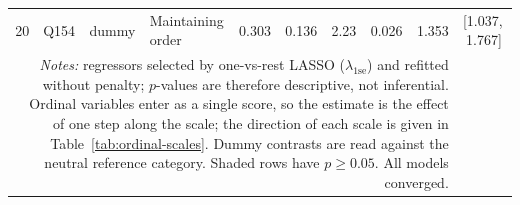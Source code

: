 \begin{landscape}
\begin{longtable}{r l l l r r r r r c}
20 & Q154 & dummy & Maintaining order & 0.303 & 0.136 & 2.23 & 0.026 & 1.353 & [1.037,\,1.767] &  \\
\multicolumn{9}{p{0.95\linewidth}}{\footnotesize \emph{Notes:} regressors selected by one-vs-rest LASSO ($\lambda_{1\text{se}}$) and refitted without penalty; $p$-values are therefore descriptive, not inferential. Ordinal variables enter as a single score, so the estimate is the effect of one step along the scale; the direction of each scale is given in Table~\ref{tab:ordinal-scales}. Dummy contrasts are read against the neutral reference category. Shaded rows have $p \geq 0.05$. All models converged.}\\
\end{longtable}
\endgroup
\end{landscape}
